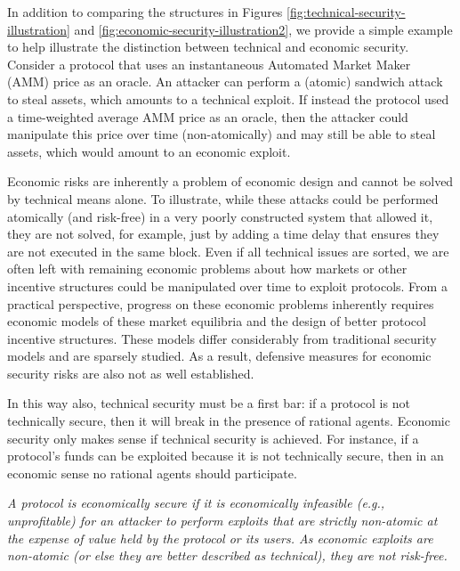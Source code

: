 In addition to comparing the structures in Figures \ref{fig:technical-security-illustration} and \ref{fig:economic-security-illustration2}, we provide a simple example to help illustrate the distinction between technical and economic security. Consider a protocol that uses an instantaneous Automated Market Maker (AMM) price as an oracle. An attacker can perform a (atomic) sandwich attack to steal assets, which amounts to a technical exploit. If instead the protocol used a time-weighted average AMM price as an oracle, then the attacker could manipulate this price over time (non-atomically) and may still be able to steal assets, which would amount to an economic exploit.

Economic risks are inherently a problem of economic design and cannot be solved by technical means alone. To illustrate, while these attacks could be performed atomically (and risk-free) in a very poorly constructed system that allowed it, they are not solved, for example, just by adding a time delay that ensures they are not executed in the same block. Even if all technical issues are sorted, we are often left with remaining economic problems about how markets or other incentive structures could be manipulated over time to exploit protocols.
From a practical perspective, progress on these economic problems inherently requires economic models of these market equilibria and the design of better protocol incentive structures. These models differ considerably from traditional security models and are sparsely studied. As a result, defensive measures for economic security risks are also not as well established.

In this way also, technical security must be a first bar: if a protocol is not technically secure, then it will break in the presence of rational agents. Economic security only makes sense if technical security is achieved. For instance, if a protocol's funds can be exploited because it is not technically secure, then in an economic sense no rational agents should participate.


\begin{tcolorbox}[boxsep=1pt,left=2pt,right=2pt,top=2pt,bottom=2pt, title=Economic Security]
  \emph{A protocol is economically secure if it is economically infeasible (e.g., unprofitable) for an attacker to perform exploits that are strictly non-atomic at the expense of value held by the protocol or its users. As economic exploits are non-atomic (or else they are better described as technical), they are not risk-free.}
\end{tcolorbox}
